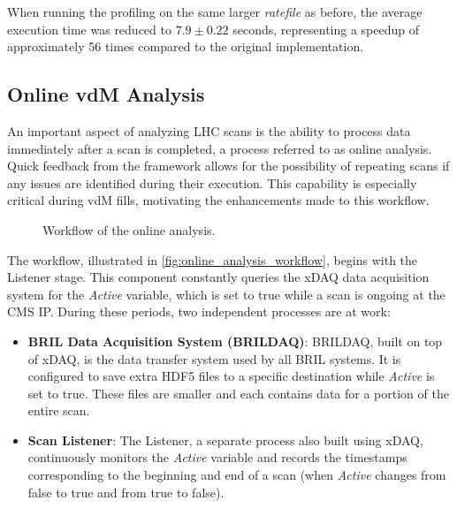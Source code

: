 When running the profiling on the same larger \textit{ratefile} as before, the average execution time was reduced to $7.9 \pm 0.22$ seconds, representing a speedup of approximately 56 times compared to the original implementation.

\subsection{Online vdM Analysis}

An important aspect of analyzing LHC scans is the ability to process data immediately after a scan is completed, a process referred to as online analysis. Quick feedback from the framework allows for the possibility of repeating scans if any issues are identified during their execution. This capability is especially critical during vdM fills, motivating the enhancements made to this workflow.

\begin{figure}[!htb]
	\centering
	\caption{Workflow of the online analysis.}
	\label{fig:online_analysis_workflow}
\end{figure}

The workflow, illustrated in \autoref{fig:online_analysis_workflow}, begins with the Listener stage. This component constantly queries the xDAQ data acquisition system \cite{Brigljevic:845273} for the \textit{Active} variable, which is set to true while a scan is ongoing at the CMS IP. During these periods, two independent processes are at work:

\begin{itemize}
	\item \textbf{BRIL Data Acquisition System (BRILDAQ)}: BRILDAQ, built on top of xDAQ, is the data transfer system used by all BRIL systems. It is configured to save extra HDF5 files to a specific destination while \textit{Active} is set to true. These files are smaller and each contains data for a portion of the entire scan.
	\item \textbf{Scan Listener}: The Listener, a separate process also built using xDAQ, continuously monitors the \textit{Active} variable and records the timestamps corresponding to the beginning and end of a scan (when \textit{Active} changes from false to true and from true to false).
\end{itemize}

